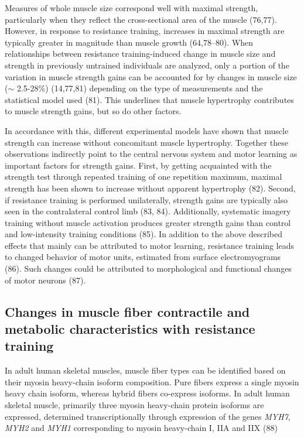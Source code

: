 \documentclass[twoside,10pt]{gihclass} %
\begin{document}
Measures of whole muscle size correspond well with maximal strength, particularly when they reflect the cross-sectional area of the muscle
(76,77).
However, in response to resistance training, increases in maximal strength are typically greater in magnitude than muscle growth
(64,78--80).
When relationships between resistance training-induced change in muscle size and strength in previously untrained individuals are analyzed, only a portion of the variation in muscle strength gains can be accounted for by changes in muscle size (\(\sim\) 2.5-28\%)
(14,77,81)
depending on the type of measurements and the statistical model used
(81).
This underlines that muscle hypertrophy contributes to muscle strength gains, but so do other factors.

In accordance with this, different experimental models have shown that muscle strength can increase without concomitant muscle hypertrophy.
Together these observations indirectly point to the central nervous system and motor learning as important factors for strength gains.
First, by getting acquainted with the strength test through repeated training of one repetition maximum, maximal strength has been shown to increase without apparent hypertrophy
(82).
Second, if resistance training is performed unilaterally, strength gains are typically also seen in the contralateral control limb
(83, 84).
Additionally, systematic imagery training without muscle activation produces greater strength gains than control and low-intensity training conditions
(85).
In addition to the above described effects that mainly can be attributed to motor learning, resistance training leads to changed behavior of motor units, estimated from surface electromyograms
(86).
Such changes could be attributed to morphological and functional changes of motor neurons
(87).

\hypertarget{changes-in-muscle-fiber-contractile-and-metabolic-characteristics-with-resistance-training}{%
\subsection{Changes in muscle fiber contractile and metabolic characteristics with resistance training}\label{changes-in-muscle-fiber-contractile-and-metabolic-characteristics-with-resistance-training}}

In adult human skeletal muscles, muscle fiber types can be identified based on their myosin heavy-chain isoform composition. Pure fibers express a single myosin heavy chain isoform, whereas hybrid fibers co-express isoforms.
In adult human skeletal muscle, primarily three myosin heavy-chain protein isoforms are expressed, determined transcriptionally through expression of the genes \emph{MYH7}, \emph{MYH2} and \emph{MYH1} corresponding to myosin heavy-chain I, IIA and IIX
(88)
\end{document}
